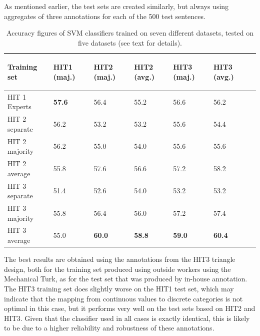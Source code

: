 \documentclass[11pt, a4paper,onecolumn]{article}
\begin{document}
As mentioned earlier, the test sets are created similarly, but always using aggregates of three annotations for each of the 500 test sentences.

\begin{table}
\begin{center}
\begin{small}
\begin{tabular}{|l|l|l|l|l|l|l|} \hline
 Training set & 
 {\begin{sideways}\parbox{2cm}{\centering HIT1 (maj.)}\end{sideways}} &
 {\begin{sideways}\parbox{2cm}{\centering HIT2 (maj.)}\end{sideways}} &
 {\begin{sideways}\parbox{2cm}{\centering HIT2 (avg.)}\end{sideways}} &
 {\begin{sideways}\parbox{2cm}{\centering HIT3 (maj.)}\end{sideways}} &
 {\begin{sideways}\parbox{2cm}{\centering HIT3 (avg.)}\end{sideways}} \\ \hline
 HIT 1 Experts & \textbf{57.6} & 56.4 & 55.2 & 56.6 & 56.2  \\ \hline \hline
 HIT 2 separate & 56.2 & 53.2 & 53.2 & 55.6 & 54.4  \\ \hline
 HIT 2 majority & 56.2 & 55.0 & 54.0 & 55.6 & 55.6  \\ \hline
 HIT 2 average & 55.8 & 57.6 & 56.6 & 57.2 & 58.2  \\ \hline \hline
 HIT 3 separate & 51.4 & 52.6 & 54.0 & 53.2 & 53.2  \\ \hline
 HIT 3 majority & 55.8 & 56.4 & 56.0 & 57.2 & 57.4  \\ \hline
 HIT 3 average & 55.0 & \textbf{60.0} & \textbf{58.8} & \textbf{59.0} & \textbf{60.4}  \\ \hline
\end{tabular}
\end{small}
\end{center}
\caption{Accuracy figures of SVM classifiers trained on seven different datasets, tested on five datasets (see text for details).}
\label{table:class_hit_comparison}
\end{table}

The best results are obtained using the annotations from the HIT3 triangle design, both for the training set produced using outside workers using the Mechanical Turk, as for the test set that was produced by in-house annotation.  The HIT3 training set does slightly worse on the HIT1 test set, which may indicate that the mapping from continuous values to discrete categories is not optimal in this case, but it performs very well on the test sets based on HIT2 and HIT3.  Given that the classifier used in all cases is exactly identical, this is likely to be due to a higher reliability and robustness of these annotations.
\end{document}
